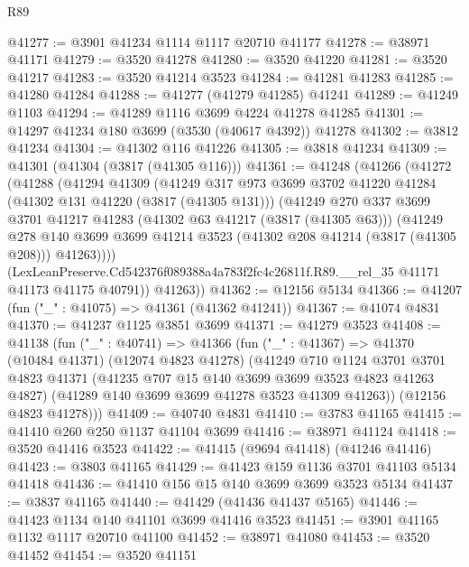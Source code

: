 \begin{lexlean}{R89}
\begin{coremodule}
@41277 := @3901 @41234 @1114 @1117 @20710 @41177
@41278 := @38971 @41171
@41279 := @3520 @41278
@41280 := @3520 @41220
@41281 := @3520 @41217
@41283 := @3520 @41214 @3523
@41284 := @41281 @41283
@41285 := @41280 @41284
@41288 := @41277 (@41279 @41285) @41241
@41289 := @41249 @1103
@41294 := @41289 @1116 @3699 @4224 @41278 @41285
@41301 := @14297 @41234 @180 @3699 (@3530 (@40617 @4392)) @41278
@41302 := @3812 @41234
@41304 := @41302 @116 @41226
@41305 := @3818 @41234
@41309 := @41301 (@41304 (@3817 (@41305 @116)))
@41361 := @41248
    (@41266
      (@41272
        (@41288
          (@41294
            @41309
            (@41249
              @317
              @973
              @3699
              @3702
              @41220
              @41284
              (@41302 @131 @41220 (@3817 (@41305 @131)))
              (@41249
                @270
                @337
                @3699
                @3701
                @41217
                @41283
                (@41302 @63 @41217 (@3817 (@41305 @63)))
                (@41249
                  @278
                  @140
                  @3699
                  @3699
                  @41214
                  @3523
                  (@41302 @208 @41214 (@3817 (@41305 @208)))
                  @41263))))
          (LexLeanPreserve.Cd542376f089388a4a783f2fc4c26811f.R89.__rel_35
            @41171
            @41173
            @41175
            @40791))
        @41263))
@41362 := @12156 @5134
@41366 := @41207 (fun ("_" : @41075) => @41361 (@41362 @41241))
@41367 := @41074 @4831
@41370 := @41237 @1125 @3851 @3699
@41371 := @41279 @3523
@41408 := @41138
    (fun ("_" : @40741) =>
    @41366
      (fun ("_" : @41367) =>
      @41370
        (@10484 @41371)
        (@12074 @4823 @41278)
        (@41249
          @710
          @1124
          @3701
          @3701
          @4823
          @41371
          (@41235 @707 @15 @140 @3699 @3699 @3523 @4823 @41263 @4827)
          (@41289 @140 @3699 @3699 @41278 @3523 @41309 @41263))
        (@12156 @4823 @41278)))
@41409 := @40740 @4831
@41410 := @3783 @41165
@41415 := @41410 @260 @250 @1137 @41104 @3699
@41416 := @38971 @41124
@41418 := @3520 @41416 @3523
@41422 := @41415 (@9694 @41418) (@41246 @41416)
@41423 := @3803 @41165
@41429 := @41423 @159 @1136 @3701 @41103 @5134 @41418
@41436 := @41410 @156 @15 @140 @3699 @3699 @3523 @5134
@41437 := @3837 @41165
@41440 := @41429 (@41436 @41437 @5165)
@41446 := @41423 @1134 @140 @41101 @3699 @41416 @3523
@41451 := @3901 @41165 @1132 @1117 @20710 @41100
@41452 := @38971 @41080
@41453 := @3520 @41452
@41454 := @3520 @41151

\end{coremodule}
\end{lexlean}
